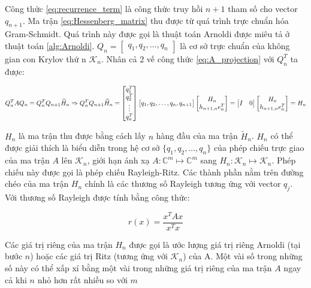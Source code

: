 \documentclass[14pt, a4paper]{article}
\numberwithin{equation}{section}
\numberwithin{algorithm}{section}
\numberwithin{figure}{section}
\numberwithin{dl}{section}
\numberwithin{md}{section}
\numberwithin{bd}{section}
\numberwithin{dn}{section}
\begin{document}
Công thức \ref{eq:recurrence_term} là công thức truy hồi $n+1$ tham số cho vector $q_{n+1}$. Ma trận \ref{eq:Hessenberg_matrix} thu được từ quá trình trực chuẩn hóa Gram-Schmidt. Quá trình này được gọi là thuật toán Arnoldi được miêu tả ở thuật toán \ref{alg:Arnoldi}. $Q_n=\begin{bmatrix} q_1, q_2, \dots, q_n \end{bmatrix}$ là cơ sở trực chuẩn của không gian con Krylov thứ n $\mathcal{K}_n$.
Nhân cả 2 vế công thức \ref{eq:A_projection} với $Q_n^T$ ta được:

\begin{equation}
    Q_n^TAQ_n=Q_n^TQ_{n+1}\widetilde{H}_n \\
    \Rightarrow Q_n^TQ_{n+1}\widetilde{H}_n = \begin{bmatrix}
        q_1^T \\ q_2^T \\ \vdots \\ q_n^T
    \end{bmatrix} \begin{bmatrix} q_1, q_2, \dots, q_n, q_{n+1} \end{bmatrix}
    \begin{bmatrix} H_n \\ h_{n+1,n}e_n^T \end{bmatrix}=\begin{bmatrix} I & 0 \end{bmatrix} \begin{bmatrix} H_n \\ h_{n+1,n}e_n^T \end{bmatrix}=H_n
\end{equation}

$H_n$ là ma trận thu được bằng cách lấy $n$ hàng đầu của ma trận $\widetilde{H}_n$. $H_n$ có thể được giải thích là biểu diễn trong hệ cơ sở $\lbrace q_1, q_2, \dots, q_n \rbrace$ của phép chiếu trực giao của ma trận $A$ lên $\mathcal{K}_n$, giới hạn ánh xạ $A: \mathbb{C}^m \mapsto \mathbb{C}^m$ sang $H_n: \mathcal{K}_n \mapsto \mathcal{K}_n$. Phép chiếu này được gọi là phép chiếu Rayleigh-Ritz.
Các thành phần nằm trên đường chéo của ma trận $H_n$ chính là các thương số Rayleigh tương ứng với vector $q_j$. Với thương số Rayleigh được tính bằng công thức:

\begin{equation}
    r(x) = \dfrac{x^T A x }{x^T x}
\end{equation}

Các giá trị riêng của ma trận $H_n$ được gọi là ước lượng giá trị riêng Arnoldi (tại bước $n$) hoặc các giá trị Ritz (tương ứng với $\mathcal{K}_n$) của A. Một vài số trong những số này có thể xấp xỉ bằng một vài trong những giá trị riêng của ma trận $A$ ngay cả khi $n$ nhỏ hơn rất nhiều so với $m$
\end{document}
